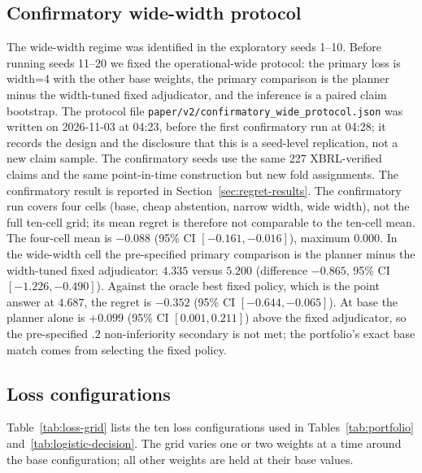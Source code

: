 \documentclass[11pt]{article}
\begin{document}
\subsection{Confirmatory wide-width protocol}
The wide-width regime was identified in the exploratory seeds 1--10. Before
running seeds 11--20 we fixed the operational-wide protocol: the primary loss
is width=4 with the other base weights, the primary comparison is the planner
minus the width-tuned fixed adjudicator, and the inference is a paired claim
bootstrap. The protocol file
\texttt{paper/\allowbreak v2/\allowbreak confirmatory\_wide\_protocol.json} was written on 2026-11-03
at 04:23, before the first confirmatory run at 04:28; it records the design and
the disclosure that this is a seed-level replication, not a new claim sample.
The confirmatory seeds use the same 227 XBRL-verified claims and the same
point-in-time construction but new fold assignments. The confirmatory result is
reported in Section~\ref{sec:regret-results}. The confirmatory run covers four
cells (base, cheap abstention, narrow width, wide width), not the full ten-cell
grid; its mean regret is therefore not comparable to the ten-cell mean. The
four-cell mean is \(-0.088\) (95\% CI \([-0.161,-0.016]\)), maximum 0.000. In
the wide-width cell the pre-specified primary comparison is the planner minus
the width-tuned fixed adjudicator: $4.335$ versus $5.200$ (difference
$-0.865$, 95\% CI $[-1.226,-0.490]$). Against the oracle best fixed policy,
which is the point answer at $4.687$, the regret is \(-0.352\) (95\% CI
\([-0.644,-0.065]\)). At base the planner alone is $+0.099$ (95\% CI
$[0.001,0.211]$) above the fixed adjudicator, so the pre-specified $.2$
non-inferiority secondary is not met; the portfolio's exact base match comes
from selecting the fixed policy.

\subsection{Loss configurations}
\label{app:loss-grid}
Table~\ref{tab:loss-grid} lists the ten loss configurations used in
Tables~\ref{tab:portfolio} and~\ref{tab:logistic-decision}. The grid varies one
or two weights at a time around the base configuration; all other weights are
held at their base values.
\end{document}
